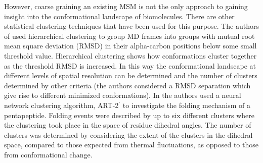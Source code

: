 \begin{highlighted}

However, coarse graining an existing MSM is not the only approach to gaining insight into the conformational landscape of biomolecules.  There are other statistical clustering techniques that have been used for this purpose. The authors of \cite{troyerProteinConformationalLandscapes1995} used hierarchical clustering \cite[chapter 10 of]{friedman2001elements} to group MD frames into groups with mutual root mean square deviation (RMSD) in their alpha-carbon positions below some small threshold value. Hierarchical clustering shows how conformations cluster together as the threshold RMSD is increased.  In this way the conformational landscape at different levels of spatial resolution can be determined and the number of clusters determined by other criteria (the authors considered a RMSD separation which give rise to different minimized conformations).  In \cite{karpen1993statistical} the authors used a neural network clustering algorithm, ART-2$^{\prime}$ \cite{carpenterARTSelforganizationStable1987} to investigate the folding mechanism of a pentapeptide. Folding events were described by up to six different clusters where the clustering took place in the space of residue dihedral angles. The number of clusters was determined by considering the extent of the clusters in the dihedral space, compared to those expected from thermal fluctuations, as opposed to those from conformational change. 


\end{highlighted}
